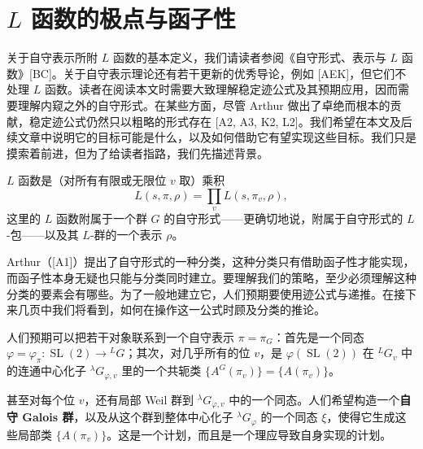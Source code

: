 \section{\texorpdfstring{$L$ 函数的极点与函子性}{L 函数的极点与函子性}}

关于自守表示所附 $L$ 函数的基本定义，我们请读者参阅《自守形式、表示与 $L$ 函数》[BC]。关于自守表示理论还有若干更新的优秀导论，例如 [AEK]，但它们不处理 $L$ 函数。读者在阅读本文时需要大致理解稳定迹公式及其预期应用，因而需要理解内窥之外的自守形式。在某些方面，尽管 Arthur 做出了卓绝而根本的贡献，稳定迹公式仍然只以粗略的形式存在 [A2, A3, K2, L2]。我们希望在本文及后续文章中说明它的目标可能是什么，以及如何借助它有望实现这些目标。我们只是摸索着前进，但为了给读者指路，我们先描述背景。

$L$ 函数是（对所有有限或无限位 $v$ 取）乘积
\begin{equation}\tag{1.1}
L(s,\pi,\rho)=\prod_v L(s,\pi_v,\rho),
\end{equation}
这里的 $L$ 函数附属于一个群 $G$ 的自守形式——更确切地说，附属于自守形式的 $L$-包——以及其 $L$-群的一个表示 $\rho$。

Arthur（[A1]）提出了自守形式的一种分类，这种分类只有借助函子性才能实现，而函子性本身无疑也只能与分类同时建立。要理解我们的策略，至少必须理解这种分类的要素会有哪些。为了一般地建立它，人们预期要使用迹公式与递推。在接下来几页中我们将看到，如何在操作这一公式时顾及分类的推论。

人们预期可以把若干对象联系到一个自守表示 $\pi=\pi_G$：首先是一个同态 $\varphi=\varphi_\pi:\operatorname{SL}(2)\to{}^LG$；其次，对几乎所有的位 $v$，是 $\varphi(\operatorname{SL}(2))$ 在 ${}^LG_v$ 中的连通中心化子 ${}^{\lambda}G_{\varphi,v}$ 里的一个共轭类 $\{A^G(\pi_v)\}=\{A(\pi_v)\}$。

甚至对每个位 $v$，还有局部 Weil 群到 ${}^{\lambda}G_{\varphi,v}$ 中的一个同态。人们希望构造一个\textbf{自守 Galois 群}，以及从这个群到整体中心化子 ${}^{\lambda}G_\varphi$ 的一个同态 $\xi$，使得它生成这些局部类 $\{A(\pi_v)\}$。这是一个计划，而且是一个理应导致自身实现的计划。

